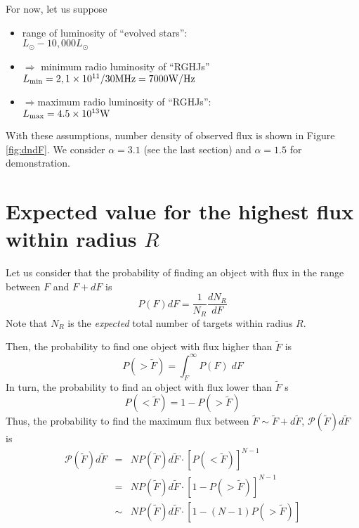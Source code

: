 \documentclass[12pt]{emulateapj}
\begin{document}
For now, let us suppose
\begin{itemize}
\item range of luminosity of ``evolved stars'':\\$L_{\odot }-10,000 L_{\odot }$
\item $\Rightarrow$ minimum radio luminosity of ``RGHJs''\\%
$L_{\rm min} = 2,1\times 10^{11}/30 {\rm MHz} = 7000 {\rm W/Hz}$
\item $\Rightarrow $maximum radio luminosity of ``RGHJs'':\\$L_{\rm max} = 4.5\times 10^{13} {\rm W}$
\end{itemize}
With these assumptions, number density of observed flux is shown in Figure \ref{fig:dndF}. We consider $\alpha = 3.1$ (see the last section) and $\alpha = 1.5$ for demonstration. 

\vspace{2\baselineskip}

\section{Expected value for the highest flux within radius $R$}


Let us consider that the probability of finding an object with flux in the range between $F$ and $F + dF$ is
\begin{equation}
P (F) dF = \frac{1}{N_R} \frac{dN_R}{dF}
\end{equation}
Note that $N_R$ is the {\it expected} total number of targets within radius $R$. 

Then, the probability to find one object with flux higher than $\tilde F$ is
\begin{equation}
P (> \tilde F) = \int _{\tilde F} ^{\infty}  P (F) \; dF 
\end{equation}
In turn, the probability to find an object with flux lower than $\tilde F$ s
\begin{equation}
P (< \tilde F) = 1 - P (> \tilde F)
\end{equation}
Thus, the probability to find the maximum flux between $\tilde F \sim \tilde F + d\tilde F$, $\mathcal{P} (\tilde F) d\tilde F$ is
\begin{eqnarray}
\mathcal{P} (\tilde F) d\tilde F &=& N P(\tilde F) d\tilde F \cdot \left[ P (< \tilde F) \right]^{N-1} \\
&=& N P(\tilde F) d\tilde F \cdot \left[ 1 - P (> \tilde F) \right]^{N-1} \\
&\sim & N P(\tilde F) d\tilde F \cdot \left[ 1 - ( N -1 ) P (> \tilde F) \right]
\end{eqnarray}
\end{document}
